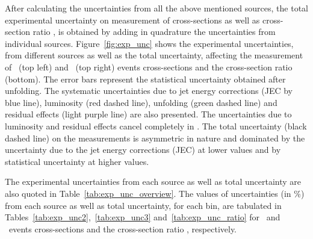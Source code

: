 After calculating the uncertainties from all the above mentioned sources, the total experimental uncertainty on measurement of cross-sections as well as cross-section ratio \rations, is obtained by adding in quadrature the uncertainties from individual sources. Figure~\ref{fig:exp_unc} shows the experimental uncertainties, from different sources as well as the total uncertainty, affecting the measurement of \njt~(top left) and \njth~(top right) events cross-sections and the cross-section ratio \ratio (bottom). The error bars represent the statistical uncertainty obtained after unfolding. The systematic uncertainties due to jet energy corrections (JEC by blue line), luminosity (red dashed line), unfolding (green dashed line) and residual effects (light purple line) are also presented. The uncertainties due to luminosity and residual effects cancel completely in \ratio. The total uncertainty (black dashed line) on the measurements is asymmetric in nature and dominated by the uncertainty due to the jet energy corrections (JEC) at lower \httwo values and by statistical uncertainty at higher \httwo values. 

The experimental uncertainties from each source as well as total uncertainty are also quoted in Table~\ref{tab:exp_unc_overview}. The values of uncertainties (in \%) from each source as well as total uncertainty, for each \httwo bin, are tabulated in Tables~\ref{tab:exp_unc2},~\ref{tab:exp_unc3} and~\ref{tab:exp_unc_ratio} for \njt~and \njth~events cross-sections and the cross-section ratio \rations, respectively. 

